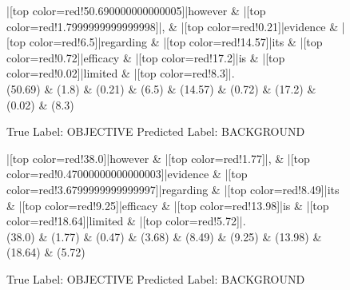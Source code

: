 \documentclass[a4paper, landscape]{article}
\begin{document}
\begin{figure}
\begin{center}
\begin{dependency}
\begin{deptext}
|[top color=red!50.690000000000005]|however \& |[top color=red!1.7999999999999998]|, \& |[top color=red!0.21]|evidence \& |[top color=red!6.5]|regarding \& |[top color=red!14.57]|its \& |[top color=red!0.72]|efficacy \& |[top color=red!17.2]|is \& |[top color=red!0.02]|limited \& |[top color=red!8.3]|.\\
(50.69) \& (1.8) \& (0.21) \& (6.5) \& (14.57) \& (0.72) \& (17.2) \& (0.02) \& (8.3)\\
\end{deptext}
\end{dependency}
\end{center}
\caption{True Label: OBJECTIVE Predicted Label: BACKGROUND}
\end{figure}
\clearpage
\begin{figure}
\begin{center}
\begin{dependency}
\begin{deptext}
|[top color=red!38.0]|however \& |[top color=red!1.77]|, \& |[top color=red!0.47000000000000003]|evidence \& |[top color=red!3.6799999999999997]|regarding \& |[top color=red!8.49]|its \& |[top color=red!9.25]|efficacy \& |[top color=red!13.98]|is \& |[top color=red!18.64]|limited \& |[top color=red!5.72]|.\\
(38.0) \& (1.77) \& (0.47) \& (3.68) \& (8.49) \& (9.25) \& (13.98) \& (18.64) \& (5.72)\\
\end{deptext}
\end{dependency}
\end{center}
\caption{True Label: OBJECTIVE Predicted Label: BACKGROUND}
\end{figure}
\clearpage
\end{document}
